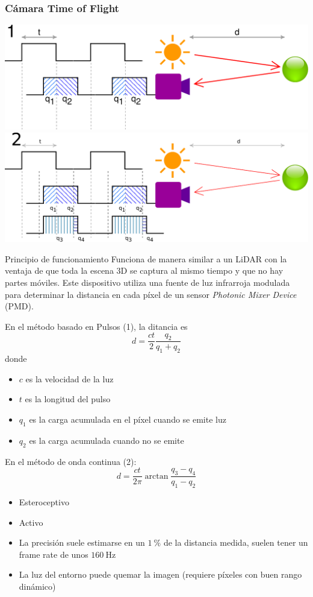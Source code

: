 \begin{frame}
    \frametitle{Cámara Time of Flight}
    \tiny
    \begin{center}
        \includegraphics[width=0.3\columnwidth]{images/time_of_flight_camera_pulse.pdf}
        \hspace{3em}
        \includegraphics[width=0.3\columnwidth]{images/time_of_flight_camera_continuous_wave.pdf}
    \end{center}

    \begin{block}{Principio de funcionamiento}
        Funciona de manera similar a un LiDAR con la ventaja de que toda la escena 3D se captura al mismo tiempo y que no hay partes móviles. Este dispositivo utiliza una fuente de luz infrarroja modulada para determinar la distancia en cada píxel de un sensor \emph{Photonic Mixer Device} (PMD).
        
        En el método basado en Pulsos (1), la ditancia es
        \begin{equation*}
            d = \dfrac{c t}{2} \dfrac{q_{2}}{q_{1} + q_{2}}
        \end{equation*}
        donde
        \begin{itemize}
            \item $c$ es la velocidad de la luz
            \item $t$ es la longitud del pulso
            \item $q_{1}$ es la carga acumulada en el píxel cuando se emite luz
            \item $q_{2}$ es la carga acumulada cuando no se emite
        \end{itemize}
        
        En el método de onda continua (2):
        \begin{equation*}
            d = \dfrac{c t}{2\pi} \arctan \dfrac{q_{3} - q_{4}}{q_{1} - q_{2}}
        \end{equation*}        
    \end{block}
    
    \begin{itemize}
        \item Esteroceptivo
        \item Activo
        \item La precisión suele estimarse en un $\SI{1}{\percent}$ de la distancia medida, suelen tener un frame rate de unos $\SI{160}{\hertz}$
        \item La luz del entorno puede quemar la imagen (requiere píxeles con buen rango dinámico)
    \end{itemize}
    
\end{frame}